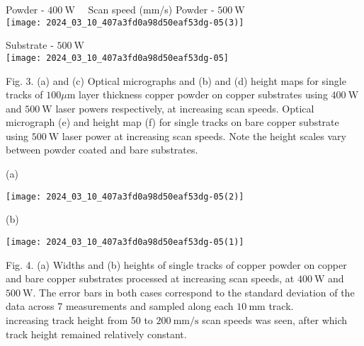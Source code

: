 \documentclass[10pt]{article}
\begin{document}
Powder - $400 \mathrm{~W} \quad$ Scan speed (mm/s) Powder - $500 \mathrm{~W}$\\
\texttt{[image: 2024\_03\_10\_407a3fd0a98d50eaf53dg-05(3)]}

Substrate - $500 \mathrm{~W}$\\
\texttt{[image: 2024\_03\_10\_407a3fd0a98d50eaf53dg-05]}

Fig. 3. (a) and (c) Optical micrographs and (b) and (d) height maps for single tracks of $100 \mu \mathrm{m}$ layer thickness copper powder on copper substrates using $400 \mathrm{~W}$ and $500 \mathrm{~W}$ laser powers respectively, at increasing scan speeds. Optical micrograph (e) and height map (f) for single tracks on bare copper substrate using $500 \mathrm{~W}$ laser power at increasing scan speeds. Note the height scales vary between powder coated and bare substrates.

(a)

\begin{center}
\texttt{[image: 2024\_03\_10\_407a3fd0a98d50eaf53dg-05(2)]}
\end{center}

(b)

\begin{center}
\texttt{[image: 2024\_03\_10\_407a3fd0a98d50eaf53dg-05(1)]}
\end{center}

Fig. 4. (a) Widths and (b) heights of single tracks of copper powder on copper and bare copper substrates processed at increasing scan speeds, at $400 \mathrm{~W}$ and $500 \mathrm{~W}$. The error bars in both cases correspond to the standard deviation of the data across 7 measurements and sampled along each $10 \mathrm{~mm}$ track.\\
increasing track height from 50 to $200 \mathrm{~mm} / \mathrm{s}$ scan speeds was seen, after which track height remained relatively constant.
\end{document}
